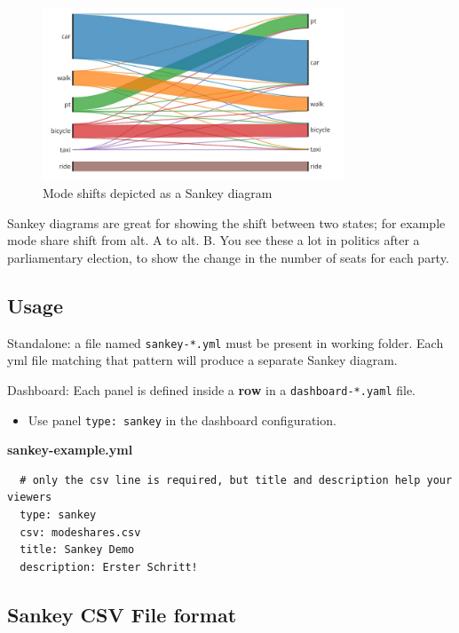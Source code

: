 \begin{figure}[H]
  \centering
  \includegraphics[width=0.8\textwidth]{assets/sankey.jpg}
  \caption{Mode shifts depicted as a Sankey diagram}
\end{figure}

Sankey diagrams are great for showing the shift between two states; for example
mode share shift from alt. A to alt. B. You see these a lot in politics
after a parliamentary election, to show the change in the number of
seats for each party.

\hypertarget{usage}{%
\subsection{Usage}}

Standalone: a file named \texttt{sankey-*.yml} must be present in
working folder. Each yml file matching that pattern will produce a
separate Sankey diagram.

Dashboard: Each panel is defined inside a \textbf{row} in a
\texttt{dashboard-*.yaml} file.

\begin{itemize}
\tightlist
\item
  Use panel \texttt{type:\ sankey} in the dashboard configuration.
\end{itemize}

\textbf{sankey-example.yml}

\begin{lstlisting}
  # only the csv line is required, but title and description help your viewers
  type: sankey
  csv: modeshares.csv
  title: Sankey Demo
  description: Erster Schritt!
\end{lstlisting}

\hypertarget{sankey-csv-file-format}{%
\subsection{Sankey CSV File format}\label{sankey-csv-file-format}}

